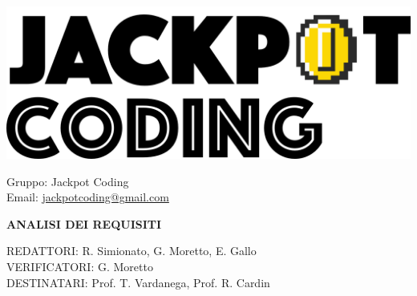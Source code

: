 \documentclass[5pt]{article}
\begin{document}
\begin{minipage}[t]{0.50\textwidth}
    \begin{flushleft}
        \hspace{10pt}
        \includegraphics[scale=0.65]{jackpot-logo.png} 
    \end{flushleft}
\end{minipage}
\hspace{-60pt} %
\begin{flushright}
    \begin{minipage}[t]{0.50\textwidth}
        \begin{flushright}
            Gruppo: {\Large Jackpot Coding}\\
            Email: \href{mailto:jackpotcoding@gmail.com}{jackpotcoding@gmail.com}
        \end{flushright}
    \end{minipage}
\end{flushright}

\vspace{24pt}

\begin{center}
    \textbf{\LARGE ANALISI DEI REQUISITI}
\end{center}

\vspace{13pt}

\begin{flushleft}
    \begin{spacing}{1.5}
        REDATTORI: R. Simionato, G. Moretto, E. Gallo\\%
        VERIFICATORI: G. Moretto\\
        \vspace{7pt}
        DESTINATARI: Prof. T. Vardanega, Prof. R. Cardin\\%
    \end{spacing}
\end{flushleft}
\end{document}

